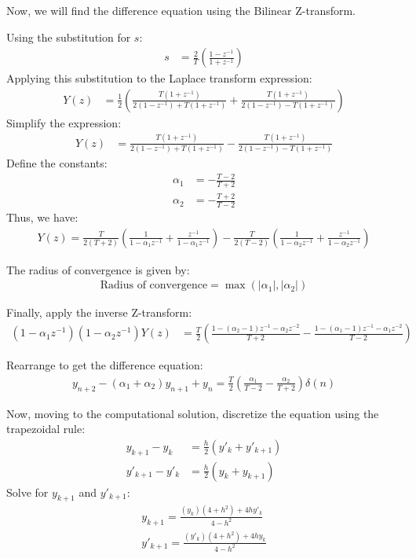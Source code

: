 \documentclass[journal]{IEEEtran}
\begin{document}
Now, we will find the difference equation using the Bilinear Z-transform.

Using the substitution for \( s \):
\begin{align}
	s &= \frac{2}{T}\left( \frac{1 - z^{-1}}{1 + z^{-1}} \right)
\end{align}
Applying this substitution to the Laplace transform expression:
\begin{align}
	Y(z) &= \frac{1}{2} \left( \frac{T(1 + z^{-1})}{2(1 - z^{-1}) + T(1 + z^{-1})} + \frac{T(1 + z^{-1})}{2(1 - z^{-1}) - T(1 + z^{-1})} \right)
\end{align}
Simplify the expression:
\begin{align}
	Y(z) &= \frac{T(1 + z^{-1})}{2(1 - z^{-1}) + T(1 + z^{-1})} - \frac{T(1 + z^{-1})}{2(1 - z^{-1}) - T(1 + z^{-1})}
\end{align}
Define the constants:
\begin{align}
	\alpha_1 &= -\frac{T - 2}{T + 2} \\
	\alpha_2 &= -\frac{T + 2}{T - 2}
\end{align}
Thus, we have:
\begin{align}
	Y(z) = \frac{T}{2(T + 2)} \left( \frac{1}{1 - \alpha_1 z^{-1}} + \frac{z^{-1}}{1 - \alpha_1 z^{-1}} \right) - \frac{T}{2(T - 2)} \left( \frac{1}{1 - \alpha_2 z^{-1}} + \frac{z^{-1}}{1 - \alpha_2 z^{-1}} \right)
\end{align}

The radius of convergence is given by:
\begin{align}
	\text{Radius of convergence} = \max(\lvert \alpha_1 \rvert, \lvert \alpha_2 \rvert)
\end{align}

Finally, apply the inverse Z-transform:
\begin{align}
	(1 - \alpha_1 z^{-1})(1 - \alpha_2 z^{-1}) Y(z) &= \frac{T}{2} \left( \frac{1 - (\alpha_2 - 1) z^{-1} - \alpha_2 z^{-2}}{T + 2} - \frac{1 - (\alpha_1 - 1) z^{-1} - \alpha_1 z^{-2}}{T - 2} \right)
\end{align}

Rearrange to get the difference equation:
\begin{align}
	y_{n+2} - (\alpha_1 + \alpha_2) y_{n+1} + y_n = \frac{T}{2} \left( \frac{\alpha_1}{T - 2} - \frac{\alpha_2}{T + 2} \right) \delta(n)
\end{align}

Now, moving to the computational solution, discretize the equation using the trapezoidal rule:
\begin{align}
	y_{k+1} - y_{k} &= \frac{h}{2} \left( y'_{k} + y'_{ k+1} \right) \\
	y'_{k+1} - y'_{k} &= \frac{h}{2} \left( y_{k} + y_{ k+1} \right)
\end{align}
Solve for \( y_{k+1} \) and \( y'_{k+1} \):
\begin{align}
	y_{k+1} = \frac{(y_{k})(4 + h^2) + 4h y'_{k}}{4 - h^2} \\
	y'_{k+1} = \frac{(y'_{k})(4 + h^2) + 4h y_{k}}{4 - h^2}
\end{align}
\end{document}
